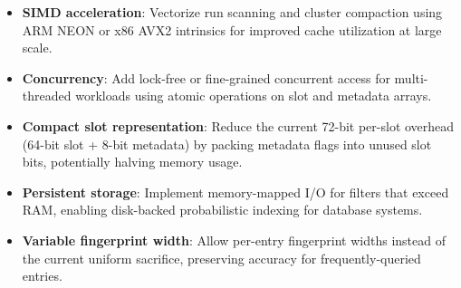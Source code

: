   \begin{itemize}
    \item \textbf{SIMD acceleration}: Vectorize run scanning and cluster compaction
          using ARM NEON or x86 AVX2 intrinsics for improved cache utilization at
          large scale.

    \item \textbf{Concurrency}: Add lock-free or fine-grained concurrent access
          for multi-threaded workloads using atomic operations on slot and metadata
          arrays.

    \item \textbf{Compact slot representation}: Reduce the current 72-bit per-slot
          overhead (64-bit slot + 8-bit metadata) by packing metadata flags into
          unused slot bits, potentially halving memory usage.

    \item \textbf{Persistent storage}: Implement memory-mapped I/O for filters
          that exceed RAM, enabling disk-backed probabilistic indexing for
          database systems.

    \item \textbf{Variable fingerprint width}: Allow per-entry fingerprint widths
          instead of the current uniform sacrifice, preserving accuracy for
          frequently-queried entries.
  \end{itemize}
